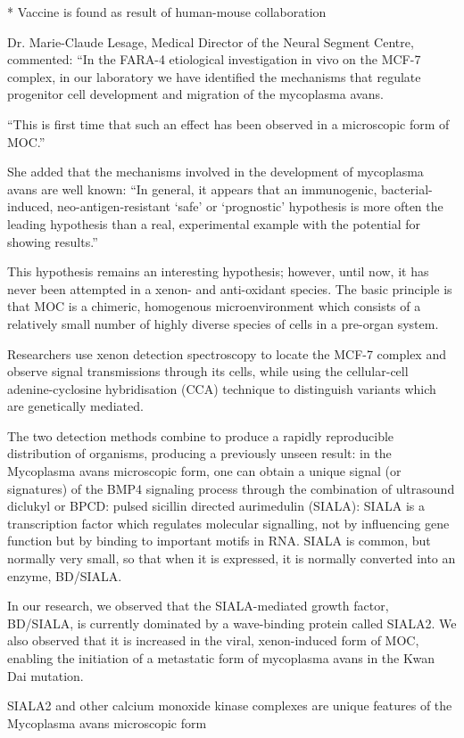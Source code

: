 \documentclass{article}
\begin{document}
* Vaccine is found as result of human-mouse collaboration

Dr. Marie-Claude Lesage, Medical Director of the Neural Segment Centre, commented: “In the FARA-4 etiological investigation in vivo on the MCF-7 complex, in our laboratory we have identified the mechanisms that regulate progenitor cell development and migration of the mycoplasma avans.

“This is first time that such an effect has been observed in a microscopic form of MOC.”

She added that the mechanisms involved in the development of mycoplasma avans are well known: “In general, it appears that an immunogenic, bacterial-induced, neo-antigen-resistant ‘safe’ or ‘prognostic’ hypothesis is more often the leading hypothesis than a real, experimental example with the potential for showing results.”

This hypothesis remains an interesting hypothesis; however, until now, it has never been attempted in a xenon- and anti-oxidant species. The basic principle is that MOC is a chimeric, homogenous microenvironment which consists of a relatively small number of highly diverse species of cells in a pre-organ system.

Researchers use xenon detection spectroscopy to locate the MCF-7 complex and observe signal transmissions through its cells, while using the cellular-cell adenine-cyclosine hybridisation (CCA) technique to distinguish variants which are genetically mediated.

The two detection methods combine to produce a rapidly reproducible distribution of organisms, producing a previously unseen result: in the Mycoplasma avans microscopic form, one can obtain a unique signal (or signatures) of the BMP4 signaling process through the combination of ultrasound diclukyl or BPCD: pulsed sicillin directed aurimedulin (SIALA): SIALA is a transcription factor which regulates molecular signalling, not by influencing gene function but by binding to important motifs in RNA. SIALA is common, but normally very small, so that when it is expressed, it is normally converted into an enzyme, BD/SIALA.

In our research, we observed that the SIALA-mediated growth factor, BD/SIALA, is currently dominated by a wave-binding protein called SIALA2. We also observed that it is increased in the viral, xenon-induced form of MOC, enabling the initiation of a metastatic form of mycoplasma avans in the Kwan Dai mutation.

SIALA2 and other calcium monoxide kinase complexes are unique features of the Mycoplasma avans microscopic form
\end{document}
